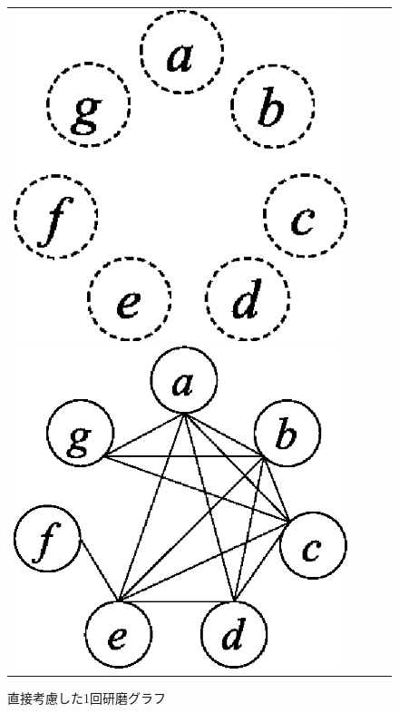 \begin{figure}[htbp]
\begin{center}
\begin{tabular}{cccc}
\begin{minipage}{0.25\hsize}
\begin{center}
\includegraphics[scale=0.5]{./polished1.eps}
\caption{直接考慮しない3回研磨グラフ\label{fig:polished1}}
\end{center}
\end{minipage}

\begin{minipage}{0.25\hsize}
\begin{center}
\includegraphics[scale=0.5]{./polished2.eps}
\caption{直接考慮した1回研磨グラフ\label{fig:polished2}}
\end{center}
\end{minipage}


\end{tabular}
\end{center}
\end{figure}
